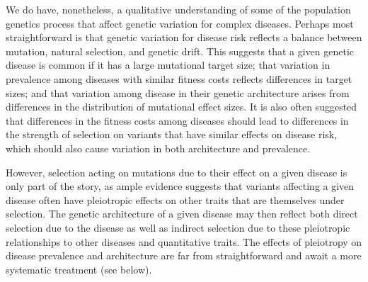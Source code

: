 \message{ !name(ResearchStrategy.tex)}\documentclass[11pt]{article}
\begin{document}
We do have, nonetheless, a qualitative understanding of some of the population genetics process that affect genetic variation for complex diseases. Perhaps most straightforward is that genetic variation for disease risk reflects a balance between mutation, natural selection, and genetic drift.\cite{Johnson:2005do} This suggests that a given genetic disease is common if it has a large mutational target size; that variation in prevalence among diseases with similar fitness costs reflects differences in target sizes; and that variation among disease in their genetic architecture arises from differences in the distribution of mutational effect sizes. It is also often suggested that differences in the fitness costs among diseases should lead to differences in the strength of selection on variants that have similar effects on disease risk\cite{Manolio:2009jp, Simons:2014fj}, which should also cause variation in both architecture and prevalence. 

However, selection acting on mutations due to their effect on a given disease is only part of the story, as ample evidence suggests that variants affecting a given disease often have pleiotropic effects on other traits that are themselves under selection\cite{BulikSullivan:2015jf,Pickrell:2016ko, Visscher:2016fp}. The genetic architecture of a given disease may then reflect both direct selection due to the disease as well as indirect selection due to these pleiotropic relationships to other diseases and quantitative traits\cite{Fraser:2013jj,Berg:2014bs, Corona:2013cl, Chen:2012jv, Ayub:2014hk,Polimanti:2017bv}. The effects of pleiotropy on disease prevalence and architecture are far from straightforward and await a more systematic treatment (see below).

\end{document}
